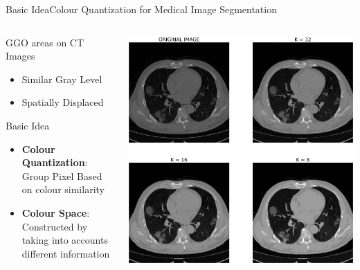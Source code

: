 \documentclass{standalone}
\begin{document}
	\begin{frame}{Basic Idea}{Colour Quantization for Medical Image Segmentation}
		
		\begin{columns}
			\begin{column}{.4\textwidth}
				\begin{block}{GGO areas on CT Images}
					\begin{itemize}
						\item Similar Gray Level
						\item Spatially Displaced
					\end{itemize}				
				\end{block}
				\begin{block}{Basic Idea}
					\begin{itemize}
						\item \textbf{Colour Quantization}: Group Pixel Based on colour similarity
						\item \textbf{Colour Space}: Constructed by taking into accounts different information
					\end{itemize}
				\end{block}				
			\end{column}
			\begin{column}{.5\textwidth}
				\centering\includegraphics[width=\linewidth]{./img/ColorQuantization}
			\end{column}
		\end{columns}
	\end{frame}
\end{document}
